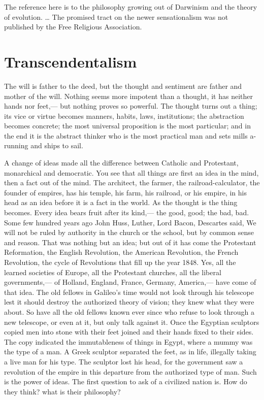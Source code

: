 \documentclass[12pt]{article}
\begin{document}
The reference here is to the philosophy growing out of Darwinism and the theory of evolution.
\ldots
The promised tract on  the newer sensationalism was not published by the Free Religious Association. 

\section*{Transcendentalism}

The will is father to the deed, but the thought and sentiment are father and mother of the will. Nothing seems more impotent than a thought, it has neither hands nor feet,--- but nothing proves so powerful. The thought turns out a thing; its vice or virtue becomes manners, habits, laws, institutions; the abstraction becomes concrete; the most universal proposition is the most particular; and in the end it is the abstract thinker who is the most practical man and sets mills a-running and ships to sail. 

A change of ideas made all the difference between Catholic and Protestant, monarchical and democratic. You see that all things are first an idea in the mind, then a fact out of the mind. The architect, the farmer, the railroad-calculator, the founder of empires, has his temple, his farm, his railroad, or his empire, in his head as an idea before it is a fact in the world. As the thought is the thing becomes. Every idea bears fruit after its kind,--- the good, good; the bad, bad. Some few hundred years ago John Huss, Luther, Lord Bacon, Descartes said, We will not be ruled by authority in the church or the school, but by common sense and reason. That was nothing but an idea; but out of it has come the Protestant Reformation, the English Revolution, the American Revolution, the French Revolution, the cycle of Revolutions that fill up the year 1848. Yes, all the learned societies of Europe, all the Protestant churches, all the liberal governments,--- of Holland, England, France, Germany, America,--- have come of that idea. The old fellows in Galileo's time would not look through his telescope lest it should destroy the authorized theory of vision; they knew what they were about. So have all the old fellows known ever since who refuse to look through a new telescope, or even at it, but only talk against it. Once the Egyptian sculptors copied men into stone with their feet joined and their hands fixed to their sides. The copy indicated the immutableness of things in Egypt, where a mummy was the type of a man. A Greek sculptor separated the feet, as in life, illegally taking a live man for his type. The sculptor lost his head, for the government saw a revolution of the empire in this departure from the authorized type of man. Such is the power of ideas. The first question to ask of a civilized nation is. How do they think? what is their philosophy? 
\end{document}
